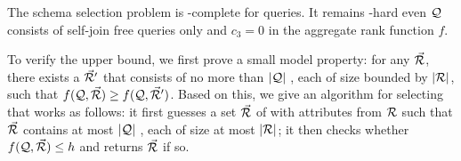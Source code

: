 \begin{theorem}\label{thm-complexity}
  The \baav schema selection problem
  is \NP-complete for \revise{\RA} %
  queries. 
It remains \NP-hard even  $\mathcal Q$ consists of self-join free
\SPC queries only and $c_{3} = 0$ in
the aggregate rank function $f$.
\end{theorem}

\vspace{-0.4ex}

\begin{proofS}
To verify the upper bound, we first prove a small model
property: for any \bds $\vec{{\mathcal R}}$, there exists a \bds $\vec{{\mathcal R}}'$
that consists of no more than $|{\mathcal Q}|$ \bss, each of size
bounded by $|{\mathcal R}|$, such that $f(\mathcal Q, \vec{{\mathcal R}}) \geq f(\mathcal Q,
\vec{{\mathcal R}}')$. Based on this, we give an \NP algorithm for selecting
  \bds that works as follows:
it first guesses a set $\vec{{\mathcal R}}$ of \bss with attributes from
${\mathcal R}$ such that $\vec{{\mathcal R}}$ contains at most $|{\mathcal Q}|$ \bss,
each of size at most $|{\mathcal R}|$;
it then checks whether $f(\mathcal Q, \vec{{\mathcal R}})\leq h$ and returns
$\vec{{\mathcal R}}$ if so.
%
\end{proofS}


